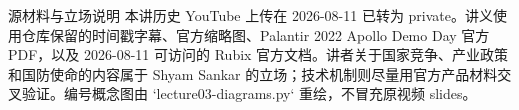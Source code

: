 \makecscover

\begin{warningbox}{源材料与立场说明}
本讲历史 YouTube 上传在 2026-08-11 已转为 private。讲义使用仓库保留的时间戳字幕、官方缩略图、Palantir 2022 Apollo Demo Day 官方 PDF，以及 2026-08-11 可访问的 Rubix 官方文档。讲者关于国家竞争、产业政策和国防使命的内容属于 Shyam Sankar 的立场；技术机制则尽量用官方产品材料交叉验证。编号概念图由 `lecture03-diagrams.py` 重绘，不冒充原视频 slides。
\end{warningbox}

